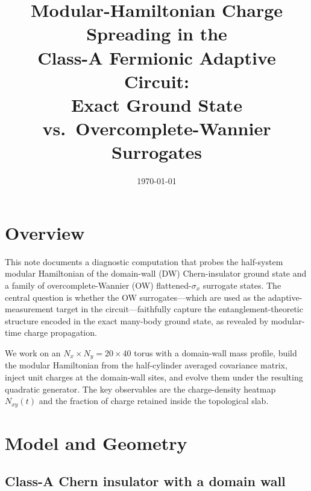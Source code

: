 \documentclass[aps,prb,twocolumn,superscriptaddress,floatfix]{revtex4-2}
\newcommand{\Nx}{N_x}
\newcommand{\Ny}{N_y}
\newcommand{\Nxy}{N_{xy}}
\begin{document}
\title{Modular-Hamiltonian Charge Spreading in the\\
       Class-A Fermionic Adaptive Circuit:\\
       Exact Ground State vs.\ Overcomplete-Wannier Surrogates}

\date{\today}
\maketitle

\section{Overview}
\label{sec:overview}

This note documents a diagnostic computation that probes the half-system
modular Hamiltonian of the domain-wall (DW) Chern-insulator ground state and
a family of overcomplete-Wannier (OW) flattened-$\sigma_x$ surrogate states.
The central question is whether the OW surrogates—which are used as the
adaptive-measurement target in the circuit—faithfully capture the
entanglement-theoretic structure encoded in the exact many-body ground state,
as revealed by modular-time charge propagation.

We work on an $\Nx \times \Ny = 20 \times 40$ torus with a domain-wall mass
profile, build the modular Hamiltonian from the half-cylinder averaged
covariance matrix, inject unit charges at the domain-wall sites, and evolve
them under the resulting quadratic generator.  The key observables are the
charge-density heatmap $\Nxy(t)$ and the fraction of charge retained inside
the topological slab.

\section{Model and Geometry}
\label{sec:model}

\subsection{Class-A Chern insulator with a domain wall}
\end{document}

